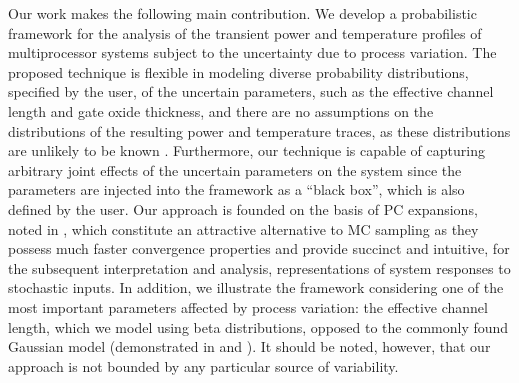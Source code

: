 Our work makes the following main contribution.
We develop a probabilistic framework for the analysis of the transient power and temperature profiles of multiprocessor systems subject to the uncertainty due to process variation.
The proposed technique is flexible in modeling diverse probability distributions, specified by the user, of the uncertain parameters, such as the effective channel length and gate oxide thickness, and there are no assumptions on the distributions of the resulting power and temperature traces, as these distributions are unlikely to be known \apriori.
Furthermore, our technique is capable of capturing arbitrary joint effects of the uncertain parameters on the system since the parameters are injected into the framework as a ``black box'', which is also defined by the user.
Our approach is founded on the basis of PC expansions, noted in , which constitute an attractive alternative to MC sampling as they possess much faster convergence properties and provide succinct and intuitive, for the subsequent interpretation and analysis, representations of system responses to stochastic inputs.
In addition, we illustrate the framework considering one of the most important parameters affected by process variation: the effective channel length, which we model using beta distributions, opposed to the commonly found Gaussian model (demonstrated in  and ).
It should be noted, however, that our approach is not bounded by any particular source of variability.
